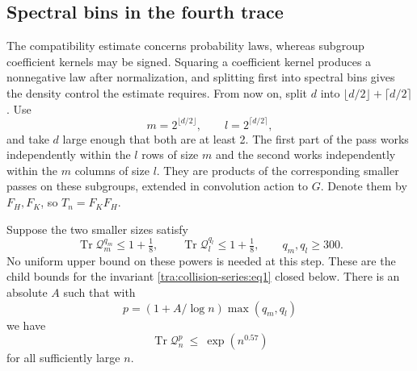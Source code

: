 \subsection{Spectral bins in the fourth trace}
\label{tra:collision-series:balanced-split}
The compatibility estimate concerns probability laws, whereas subgroup coefficient kernels may be signed. Squaring a coefficient kernel produces a nonnegative law after normalization, and splitting first into spectral bins gives the density control the estimate requires. From now on, split \(d\) into \(\lfloor d/2\rfloor+\lceil d/2\rceil\). Use
\[
m=2^{\lfloor d/2\rfloor},\qquad l=2^{\lceil d/2\rceil},
\]
and take \(d\) large enough that both are at least 2. The first part of the pass works independently within the \(l\) rows of size \(m\) and the second works independently within the \(m\) columns of size \(l\). They are products of the corresponding smaller passes on these subgroups, extended in convolution action to \(G\). Denote them by \(F_H,F_K\), so \(T_n=F_K F_H\).
\begin{proposition}\label{tra:collision-series:weak-moment}
\label{tra:collision-series:weak-moment-statement}
Suppose the two smaller sizes satisfy
\[
 \operatorname{Tr}\mathcal Q_m^{q_m}\le 1+\tfrac18,
 \qquad
 \operatorname{Tr}\mathcal Q_l^{q_l}\le 1+\tfrac18,
 \qquad q_m,q_l\ge300.
\]
No uniform upper bound on these powers is needed at this step. These are the child bounds for the invariant \eqref{tra:collision-series:eq1} closed below. There is an absolute \(A\) such that with
\[
p=(1+A/\log n)\max(q_m,q_l)
\]
we have
\begin{equation}
\operatorname{Tr} \mathcal Q_n^p\ \le\ \exp(n^{0.57}) \label{tra:collision-series:eq6}
\end{equation}
for all sufficiently large \(n\).
\end{proposition}
